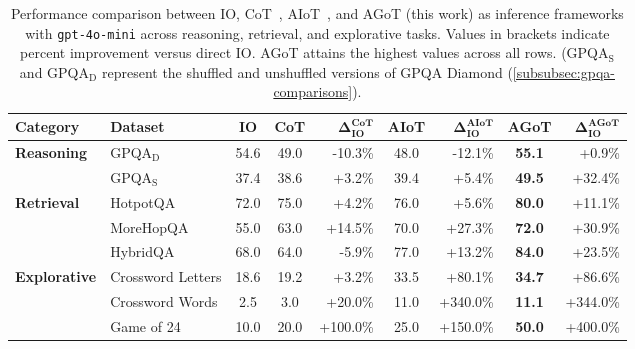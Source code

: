 \documentclass{article}
\begin{document}

\begin{table*}[ht]
    \centering
    \begin{tabular}{l|lccrcr|cr}
        \toprule
        \textbf{Category} & \textbf{Dataset} & \textbf{IO} & \textbf{CoT} & $\mathbf{\Delta^\text{CoT}_\text{IO}}$ & \textbf{AIoT} & $\mathbf{\Delta^\text{AIoT}_\text{IO}}$ & \textbf{AGoT} & $\mathbf{\Delta^{\text{AGoT}}_\text{IO}}$ \\
        \midrule
        \multirow{2}{*}{\textbf{Reasoning}}
            & GPQA$_\text{D}$ & 54.6 & 49.0 &-10.3\% & 48.0 & -12.1\% & \textbf{55.1} & +0.9\% \\
            & GPQA$_\text{S}$ & 37.4 & 38.6 & +3.2\% & 39.4 & +5.4\% & \textbf{49.5} & +32.4\% \\
        \midrule
        \multirow{3}{*}{\textbf{Retrieval}} 
            & HotpotQA & 72.0 & 75.0 & +4.2\% & 76.0 & +5.6\% & \textbf{80.0} & +11.1\% \\
            & MoreHopQA & 55.0 & 63.0 & +14.5\% & 70.0 & +27.3\% & \textbf{72.0} & +30.9\% \\
            & HybridQA & 68.0 & 64.0 & -5.9\% & 77.0 & +13.2\% & \textbf{84.0} & +23.5\% \\
        \midrule
        \multirow{3}{*}{\textbf{Explorative}}
            & Crossword Letters & 18.6 & 19.2 & +3.2\% & 33.5 & +80.1\% & \textbf{34.7} & +86.6\% \\
            & Crossword Words & 2.5 & 3.0 & +20.0\% & 11.0 & +340.0\% & \textbf{11.1} & +344.0\% \\
            & Game of 24 & 10.0 & 20.0 & +100.0\% & 25.0 & +150.0\% & \textbf{50.0} & +400.0\% \\
        \bottomrule
    \end{tabular}
    \caption{Performance comparison between IO, CoT~\citep{wei2022chain}, AIoT~\citep{radha2024iterationthoughtleveraginginner}, and AGoT (this work) as inference frameworks with \texttt{gpt-4o-mini} across reasoning, retrieval, and explorative tasks. Values in brackets indicate percent improvement versus direct IO. AGoT attains the highest values across all rows. (GPQA$_\text{S}$ and GPQA$_\text{D}$ represent the shuffled and unshuffled versions of GPQA Diamond (\autoref{subsubsec:gpqa-comparisons}).}
    \label{tab:performance_comparison}
    
\end{table*}
\end{document}

